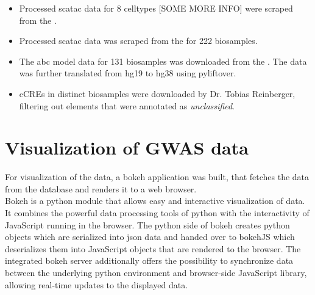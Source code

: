 \begin{itemize}
    \item {} Processed sc\ac{atac} data for 8 celltypes [SOME MORE INFO] were scraped from the .

    \item {} Processed sc\ac{atac} data was scraped from the  for 222 biosamples.

    \item {} The \ac{abc} model data for 131 biosamples was downloaded from the . The data was further translated from \ac{hg19} to \ac{hg38} using pyliftover.

    \item {} \acp{cCRE} in distinct biosamples were downloaded by Dr. Tobias Reinberger, filtering out elements that were annotated as \textit{unclassified}.
\end{itemize}

\section{Visualization of GWAS data}
\label{sec:gwas_vis}
For visualization of the data, a bokeh application was built, that fetches the data from the database and renders it to a web browser.\\
Bokeh is a python module that allows easy and interactive visualization of data. It combines the powerful data processing tools of python with the interactivity of JavaScript running in the browser. The python side of bokeh creates python objects which are serialized into \ac{json} data and handed over to bokehJS which deserializes them into JavaScript objects that are rendered to the browser. The integrated bokeh server additionally offers the possibility to synchronize data between the underlying python environment and browser-side JavaScript library, allowing real-time updates to the displayed data.

